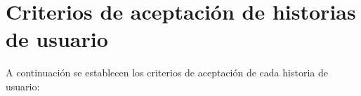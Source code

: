 \documentclass[
11pt, %
]{charter}
\begin{document}


\section{Criterios de aceptación de historias de usuario}
\label{sec:criteriosAceptacion}

A continuación se establecen los criterios de aceptación de cada historia de usuario:
\end{document}

